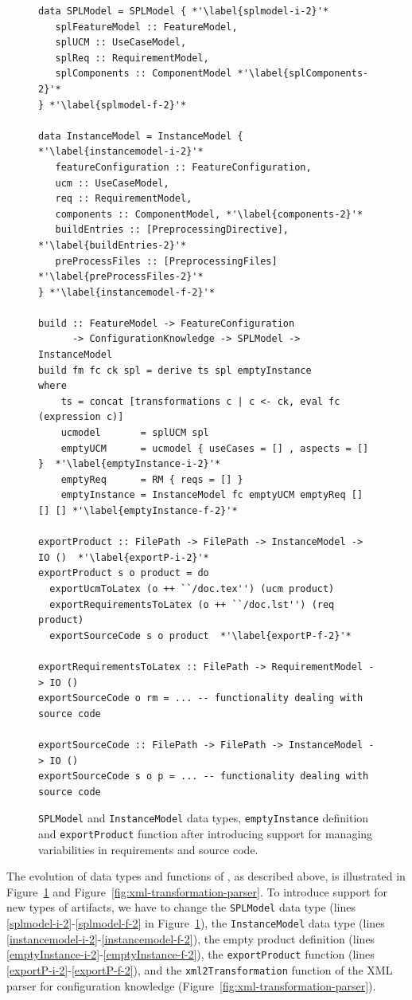 \begin{figure}[t!]
\bigskip
\begin{lstlisting}
data SPLModel = SPLModel { *'\label{splmodel-i-2}'*
   splFeatureModel :: FeatureModel,
   splUCM :: UseCaseModel,
   splReq :: RequirementModel,
   splComponents :: ComponentModel *'\label{splComponents-2}'*
} *'\label{splmodel-f-2}'*

data InstanceModel = InstanceModel { *'\label{instancemodel-i-2}'*
   featureConfiguration :: FeatureConfiguration,
   ucm :: UseCaseModel,
   req :: RequirementModel,
   components :: ComponentModel, *'\label{components-2}'*
   buildEntries :: [PreprocessingDirective], *'\label{buildEntries-2}'*
   preProcessFiles :: [PreprocessingFiles] *'\label{preProcessFiles-2}'*
} *'\label{instancemodel-f-2}'*

build :: FeatureModel -> FeatureConfiguration 
      -> ConfigurationKnowledge -> SPLModel -> InstanceModel
build fm fc ck spl = derive ts spl emptyInstance
where
    ts = concat [transformations c | c <- ck, eval fc (expression c)]
    ucmodel       = splUCM spl
    emptyUCM      = ucmodel { useCases = [] , aspects = [] }  *'\label{emptyInstance-i-2}'*
    emptyReq      = RM { reqs = [] }
    emptyInstance = InstanceModel fc emptyUCM emptyReq [] [] [] *'\label{emptyInstance-f-2}'*

exportProduct :: FilePath -> FilePath -> InstanceModel -> IO ()  *'\label{exportP-i-2}'*
exportProduct s o product = do
  exportUcmToLatex (o ++ ``/doc.tex'') (ucm product)
  exportRequirementsToLatex (o ++ ``/doc.lst'') (req product)
  exportSourceCode s o product  *'\label{exportP-f-2}'*

exportRequirementsToLatex :: FilePath -> RequirementModel -> IO ()
exportSourceCode o rm = ... -- functionality dealing with source code

exportSourceCode :: FilePath -> FilePath -> InstanceModel -> IO ()
exportSourceCode s o p = ... -- functionality dealing with source code
\end{lstlisting}
\caption{\texttt{SPLModel} and \texttt{InstanceModel} data types,
  \texttt{emptyInstance} definition and \texttt{exportProduct}
  function after introducing support for managing variabilities in
  requirements and source code.}
\label{fig:spl-model-with-req-and-code}
\bigskip
\end{figure}


The evolution of data types and functions of \hp{}, as described
above, is illustrated in Figure~\ref{fig:spl-model-with-req-and-code}
and Figure~\ref{fig:xml-transformation-parser}. To introduce support
for new types of artifacts, we have to change the \texttt{SPLModel}
data type (lines \ref{splmodel-i-2}-\ref{splmodel-f-2} in
Figure~\ref{fig:spl-model-with-req-and-code}), the
\texttt{InstanceModel} data type (lines
\ref{instancemodel-i-2}-\ref{instancemodel-f-2}), the empty product
definition (lines \ref{emptyInstance-i-2}-\ref{emptyInstance-f-2}),
the \texttt{exportProduct} function (lines
\ref{exportP-i-2}-\ref{exportP-f-2}), and the
\texttt{xml2Transformation} function of the XML parser for
configuration knowledge (Figure~\ref{fig:xml-transformation-parser}).

